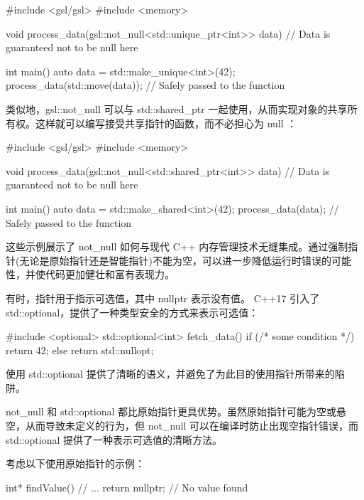 \begin{cpp}
#include <gsl/gsl>
#include <memory>

void process_data(gsl::not_null<std::unique_ptr<int>> data) {
    // Data is guaranteed not to be null here
}

int main() {
    auto data = std::make_unique<int>(42);
    process_data(std::move(data)); // Safely passed to the function
}
\end{cpp}


类似地，gsl::not\_null 可以与 std::shared\_ptr 一起使用，从而实现对象的共享所有权。这样就可以编写接受共享指针的函数，而不必担心为 null ：

\begin{cpp}
#include <gsl/gsl>
#include <memory>

void process_data(gsl::not_null<std::shared_ptr<int>> data) {
    // Data is guaranteed not to be null here
}

int main() {
    auto data = std::make_shared<int>(42);
    process_data(data); // Safely passed to the function
}
\end{cpp}

这些示例展示了 not\_null 如何与现代 C++ 内存管理技术无缝集成。通过强制指针(无论是原始指针还是智能指针)不能为空，可以进一步降低运行时错误的可能性，并使代码更加健壮和富有表现力。


有时，指针用于指示可选值，其中 nullptr 表示没有值。 C++17 引入了 std::optional，提供了一种类型安全的方式来表示可选值：

\begin{cpp}
#include <optional>
std::optional<int> fetch_data() {
    if (/* some condition */)
        return 42;
    else
        return std::nullopt;
}
\end{cpp}

使用 std::optional 提供了清晰的语义，并避免了为此目的使用指针所带来的陷阱。


not\_null 和 std::optional 都比原始指针更具优势。虽然原始指针可能为空或悬空，从而导致未定义的行为，但 not\_null 可以在编译时防止出现空指针错误，而 std::optional 提供了一种表示可选值的清晰方法。

考虑以下使用原始指针的示例：

\begin{cpp}
int* findValue() {
    // ...
    return nullptr; // No value found
}
\end{cpp}


